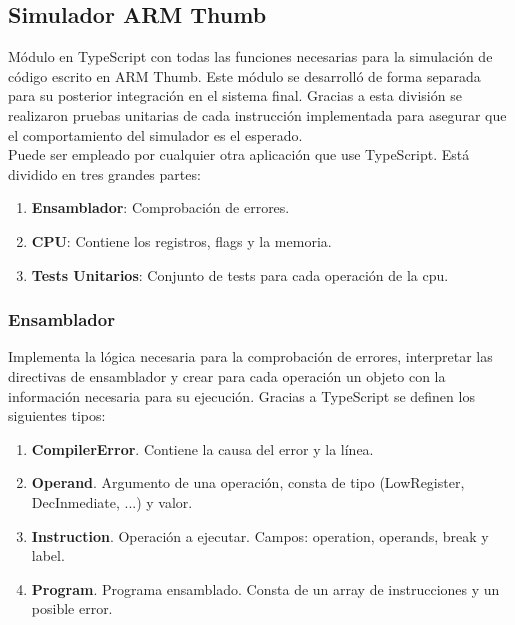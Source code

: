     \subsection{Simulador ARM Thumb}
    {
        Módulo en TypeScript con todas las funciones necesarias para la simulación de código escrito en ARM Thumb.
        Este módulo se desarrolló de forma separada para su posterior integración en el sistema final.
        Gracias a esta división se realizaron pruebas unitarias de cada instrucción implementada
        para asegurar que el comportamiento del simulador es el esperado. \\

        Puede ser empleado por cualquier otra aplicación que use TypeScript. Está dividido en tres grandes partes:
        \begin{enumerate}
            \item \textbf{Ensamblador}: Comprobación de errores.
            \item \textbf{CPU}: Contiene los registros, flags y la memoria.
            \item \textbf{Tests Unitarios}: Conjunto de tests para cada operación de la cpu.
        \end{enumerate}
    
        
        \subsubsection{Ensamblador}
        Implementa la lógica necesaria para la comprobación de errores, interpretar las directivas de ensamblador
        y crear para cada operación un objeto con la información necesaria para su ejecución.
        Gracias a TypeScript se definen los siguientes tipos:
        \begin{enumerate}
            \item \textbf{CompilerError}. Contiene la causa del error y la línea.
            \item \textbf{Operand}. Argumento de una operación, consta de tipo (LowRegister, DecInmediate, ...) y valor.
            \item \textbf{Instruction}. Operación a ejecutar. Campos: operation, operands, break y label.
            \item \textbf{Program}. Programa ensamblado. Consta de un array de instrucciones y un posible error.
        \end{enumerate}

}
